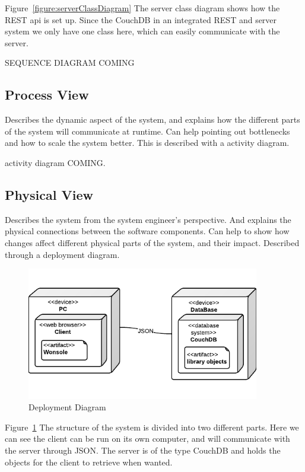 Figure~\ref{figure:serverClassDiagram} The server class diagram shows how the REST api is set up. Since the CouchDB in an integrated REST and server system we only have one class here, which can easily communicate with the server.

SEQUENCE DIAGRAM COMING



\subsection{Process View}
Describes the dynamic aspect of the system, and explains how the different parts of the system will communicate at runtime. Can help pointing out bottlenecks and how to scale the system better. This is described with a activity diagram.


activity diagram COMING.


\subsection{Physical View}
Describes the system from the system engineer's perspective. And explains the physical connections between the software components. Can help to show how changes affect different physical parts of the system, and their impact. Described through a deployment diagram. 

\begin{figure}[h]
\centering
\includegraphics[width=4in]{image/architecture/DeploymentDiagram.png}
\caption{Deployment Diagram}
\label{figure:DeploymentDiagram}
\end{figure}

Figure~\ref{figure:DeploymentDiagram} The structure of the system is divided into two different parts. Here we can see the client can be run on its own computer, and will communicate with the server through JSON. The server is of the type CouchDB and holds the objects for the client to retrieve when wanted.  


